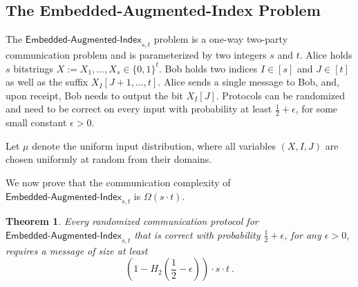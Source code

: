 \documentclass[11pt,a4paper]{article}
\newtheorem{theorem}{Theorem}
\begin{document}
\subsection{The \textsf{Embedded-Augmented-Index} Problem} \label{sec:embedded-augmented-index}
The $\textsf{Embedded-Augmented-Index}_{s,t}$ problem is a one-way two-party communication problem and is parameterized by two integers $s$ and $t$. Alice holds $s$ bitstrings $X := X_1, \dots, X_s \in \{0,1\}^{t}$. Bob holds two indices $I \in [s]$ and $J \in [t]$ as well as the suffix $X_I[J+1, \dots, t]$. Alice sends a single message to Bob, and, upon receipt, Bob needs to output the bit $X_I[J]$. Protocols can be randomized and need to be correct on every input with probability at least $\frac{1}{2} + \epsilon$, for some small constant $\epsilon > 0$.

Let $\mu$ denote the uniform input distribution, where all variables $(X, I, J)$ are chosen uniformly at random from their domains.

We now prove that the communication complexity of $\textsf{Embedded-Augmented-Index}_{s,t}$ is $\Omega(s \cdot t)$. 

\begin{theorem}\label{thm:embedded-aug-index}
    Every randomized communication protocol for $\textsf{Embedded-Augmented-Index}_{s,t}$ that is correct with probability $\frac{1}{2} + \epsilon$, for any $\epsilon > 0$, requires a message of size at least $$(1 - H_2(\frac{1}{2} - \epsilon)) \cdot s \cdot t \ .$$ 
\end{theorem}
\setcounter{counterEmbed}{\value{theorem}}
\end{document}
